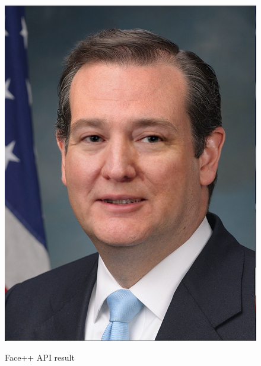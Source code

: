 \documentclass[a4paper]{article}
\begin{document}
\begin{figure}[htp]
{\begin{minipage}[b]{0.31\columnwidth}
{\includegraphics[width=1\columnwidth]{FCT.png}
}
\label{fig:3-5:f}
\end{minipage}
}
\caption{Face++ API result}
\label{fig:3-5}
\end{figure}


\newpage 
{}

\end{document}
